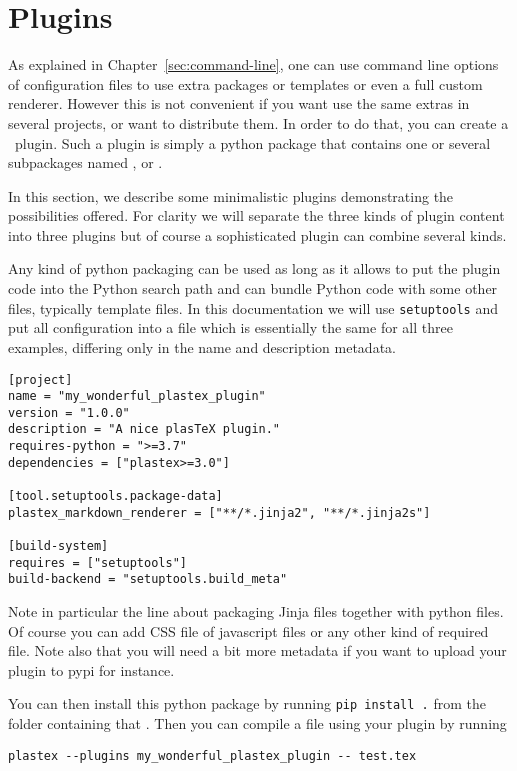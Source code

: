 \section{Plugins}
\label{sec:plugins}

As explained in Chapter~\ref{sec:command-line}, one can use command line
options of configuration files to use extra packages or templates or even a
full custom renderer.
However this is not convenient if you want use the same extras in several
projects, or want to distribute them. In order to do that, you can create a
\plasTeX\ plugin. Such a plugin is simply a python package that contains
one or several subpackages named ,  or
.

In this section, we describe some minimalistic plugins demonstrating the
possibilities offered. For clarity we will separate the three kinds of plugin content
into three plugins but of course a sophisticated plugin can combine several kinds.

Any kind of python packaging can be used as long as it allows to put the plugin code into
the Python search path and can bundle Python code with some other files, typically template files.
In this documentation we will use \texttt{setuptools} and put all configuration into
a  file which is essentially the same for all three examples,
differing only in the name and description metadata.
\begin{lstlisting}
[project]
name = "my_wonderful_plastex_plugin"
version = "1.0.0"
description = "A nice plasTeX plugin."
requires-python = ">=3.7"
dependencies = ["plastex>=3.0"]

[tool.setuptools.package-data]
plastex_markdown_renderer = ["**/*.jinja2", "**/*.jinja2s"]

[build-system]
requires = ["setuptools"]
build-backend = "setuptools.build_meta"
\end{lstlisting}

Note in particular the line about packaging Jinja files together with python files. Of course
you can add CSS file of javascript files or any other kind of required file.
Note also that you will need a bit more metadata if you want to upload your
plugin to pypi for instance.

You can then install this python package by running \verb+pip install .+ from the folder
containing that . Then you can compile a file  using your plugin by running

\begin{verbatim}
plastex --plugins my_wonderful_plastex_plugin -- test.tex
\end{verbatim}

